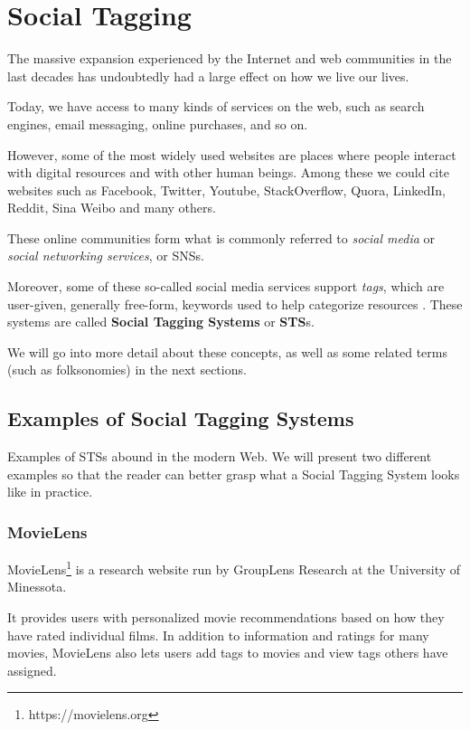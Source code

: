 \chapter{Social Tagging}\label{chap:social_tagging}

The massive expansion experienced by the Internet and web communities in the last decades has undoubtedly had a large effect on how we live our lives.

Today, we have access to many kinds of services on the web, such as search engines, email messaging, online purchases, and so on.

However, some of the most widely used websites are places where people interact with digital resources and with other human beings. Among these we could cite websites such as Facebook, Twitter, Youtube, StackOverflow, Quora, LinkedIn, Reddit, Sina Weibo and many others.

These online communities form what is commonly referred to \textit{social media} or \textit{social networking services}, or SNSs. \citep{obar_wildman_2015,hamburger_etal_2017}

Moreover, some of these so-called social media services support \textit{tags}, which are user-given, generally free-form, keywords used to help categorize resources \cite{mathes_2004}. These systems are called \textbf{Social Tagging Systems} or \textbf{STS}s.

We will go into more detail about these concepts, as well as some related terms (such as folksonomies) in the next sections.

\section{Examples of Social Tagging Systems}

Examples of STSs abound in the modern Web. We will present two different examples so that the reader can better grasp what a Social Tagging System looks like in practice.

\subsection{MovieLens}

MovieLens\footnote{https://movielens.org} is a research website run by GroupLens Research at the University of Minessota.

It provides users with personalized movie recommendations based on how they have rated individual films. In addition to information and ratings for many movies, MovieLens also lets users add tags to movies and view tags others have assigned.

